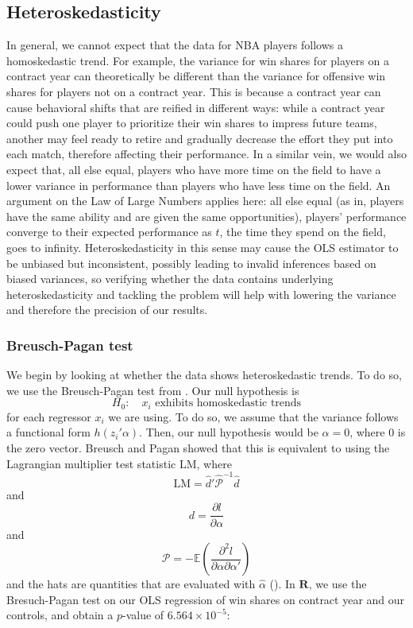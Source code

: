 \documentclass[12pt]{article}
\begin{document}
	\subsection{Heteroskedasticity}
	
	In general, we cannot expect that the data for NBA players follows a homoskedastic trend. For example, the variance for win shares for players on a contract year can theoretically be different than the variance for offensive win shares for players not on a contract year. This is because a contract year can cause behavioral shifts that are reified in different ways: while a contract year could push one player to prioritize their win shares to impress future teams, another may feel ready to retire and gradually decrease the effort they put into each match, therefore affecting their performance. In a similar vein, we would also expect that, all else equal, players who have more time on the field to have a lower variance in performance than players who have less time on the field. An argument on the Law of Large Numbers applies here: all else equal (as in, players have the same ability and are given the same opportunities), players' performance converge to their expected performance as $t$, the time they spend on the field, goes to infinity. Heteroskedasticity in this sense may cause the OLS estimator to be unbiased but inconsistent, possibly leading to invalid inferences based on biased variances, so verifying whether the data contains underlying heteroskedasticity and tackling the problem will help with lowering the variance and therefore the precision of our results.
	
	\subsubsection{Breusch-Pagan test}
	
	We begin by looking at whether the data shows heteroskedastic trends. To do so, we use the Breusch-Pagan test from \cite{breusch_simple_1979}. Our null hypothesis is \[
	H_0:\quad x_i \text{ exhibits homoskedastic trends}
	\] for each regressor $x_i$ we are using. To do so, we assume that the variance follows a functional form $h\left(z_i'\alpha\right)$. Then, our null hypothesis would be $\alpha = 0$, where $0$ is the zero vector. Breusch and Pagan showed that this is equivalent to using the Lagrangian multiplier test statistic $\mathrm{LM}$, where \[
	\mathrm{LM} = \hat{d}' \hat{\mathcal{P}}^{-1} \hat{d}
	\] and \[
	d = \frac{\partial l}{\partial \alpha}
	\] and \[
	\mathcal{P} = -\mathbb{E}\left(\frac{\partial^2 l}{\partial\alpha \partial \alpha'}\right)
	\] and the hats are quantities that are evaluated with $\hat{\alpha}$ (\cite{breusch_simple_1979}). In $\textbf{R}$, we use the Bresuch-Pagan test on our OLS regression of win shares on contract year and our controls, and obtain a $p$-value of $6.564 \times 10^{-5}$:
	
\end{document}
